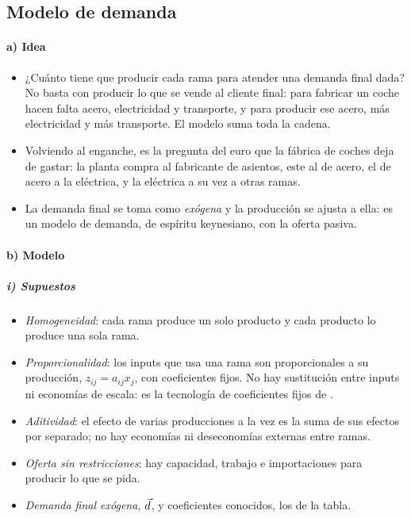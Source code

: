 \documentclass[11pt]{article}
\begin{document}
\subsection{Modelo de demanda}\label{sec:demanda}

\paragraph{a) Idea}

\begin{itemize}
\item ¿Cuánto tiene que producir cada rama para atender una demanda final dada? No basta con producir lo que se vende al cliente final: para fabricar un coche hacen falta acero, electricidad y transporte, y para producir ese acero, más electricidad y más transporte. El modelo suma toda la cadena.
\item Volviendo al enganche, es la pregunta del euro que la fábrica de coches deja de gastar: la planta compra al fabricante de asientos, este al de acero, el de acero a la eléctrica, y la eléctrica a su vez a otras ramas.
\item La demanda final se toma como \emph{exógena} y la producción se ajusta a ella: es un modelo de demanda, de espíritu keynesiano, con la oferta pasiva.
\end{itemize}

\paragraph{b) Modelo}

\subparagraph{i) Supuestos}

\begin{itemize}
\item \emph{Homogeneidad}: cada rama produce un solo producto y cada producto lo produce una sola rama.
\item \emph{Proporcionalidad}: los inputs que usa una rama son proporcionales a su producción, $z_{ij}=a_{ij}x_j$, con coeficientes fijos. No hay sustitución entre inputs ni economías de escala: es la tecnología de coeficientes fijos de  .
\item \emph{Aditividad}: el efecto de varias producciones a la vez es la suma de sus efectos por separado; no hay economías ni deseconomías externas entre ramas.
\item \emph{Oferta sin restricciones}: hay capacidad, trabajo e importaciones para producir lo que se pida.
\item \emph{Demanda final exógena}, $\vec{d}$, y coeficientes conocidos, los de la tabla.
\end{itemize}
\end{document}
